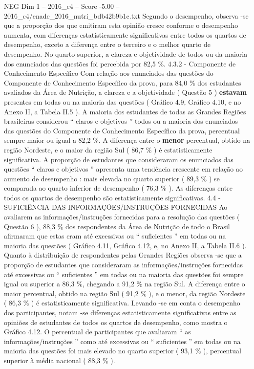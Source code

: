 \begin{textsample}{NEG Dim 1 – 2016\_c4 – Score -5.00 – 2016\_c4/enade\_2016\_nutri\_bdb42b9b1c.txt}
Segundo o desempenho, observa -se que a proporção dos que emitiram esta opinião cresce conforme o desempenho aumenta, com diferenças estatisticamente significativas entre todos os quartos de desempenho, exceto a diferença entre o terceiro e o melhor quarto de desempenho.
No quarto superior, a clareza e objetividade de todos ou da maioria dos enunciados das questões foi percebida por 82,5 \%. 4.3.2 - Componente de Conhecimento Específico Com relação aos enunciados das questões do Componente de Conhecimento Específico da prova, para 84,0 \% dos estudantes avaliados da Área de Nutrição, a clareza e a objetividade ( Questão 5 ) \textbf{estavam} presentes em todas ou na maioria das questões ( Gráfico 4.9, Gráfico 4.10, e no Anexo II, a Tabela II.5 ).
A maioria dos estudantes de todas as Grandes Regiões brasileiras considerou “ claros e objetivos ” todos ou a maioria dos enunciados das questões do Componente de Conhecimento Específico da prova, percentual sempre maior ou igual a 82,2 \%.
A diferença entre o \textbf{menor} percentual, obtido na região Nordeste, e o maior da região Sul ( 86,7 \% ) é estatisticamente significativa.
A proporção de estudantes que consideraram os enunciados das questões “ claros e objetivos ” apresenta uma tendência crescente em relação ao aumento de desempenho : mais elevada no quarto superior ( 89,3 \% ) se comparada ao quarto inferior de desempenho ( 76,3 \% ).
As diferenças entre todos os quartos de desempenho são estatisticamente significativas. 4.4 - SUFICIÊNCIA DAS INFORMAÇÕES/INSTRUÇÕES FORNECIDAS Ao avaliarem as informações/instruções fornecidas para a resolução das questões ( Questão 6 ), 88,3 \% dos respondentes da Área de Nutrição de todo o Brasil afirmaram que estas eram até excessivas ou “ suficientes ” em todas ou na maioria das questões ( Gráfico 4.11, Gráfico 4.12, e, no Anexo II, a Tabela II.6 ).
Quanto à distribuição de respondentes pelas Grandes Regiões observa -se que a proporção de estudantes que consideraram as informações/instruções fornecidas até excessivas ou “ suficientes ” em todas ou na maioria das questões foi sempre igual ou superior a 86,3 \%, chegando a 91,2 \% na região Sul.
A diferença entre o maior percentual, obtido na região Sul ( 91,2 \% ), e o menor, da região Nordeste ( 86,3 \% ) é estatisticamente significativa.
Levando -se em conta o desempenho dos participantes, notam -se diferenças estatisticamente significativas entre as opiniões de estudantes de todos os quartos de desempenho, como mostra o Gráfico 4.12.
O percentual de participantes que avaliaram “ as informações/instruções ” como até excessivas ou “ suficientes ” em todas ou na maioria das questões foi mais elevado no quarto superior ( 93,1 \% ), percentual superior à média nacional ( 88,3 \% ).

\end{textsample}
